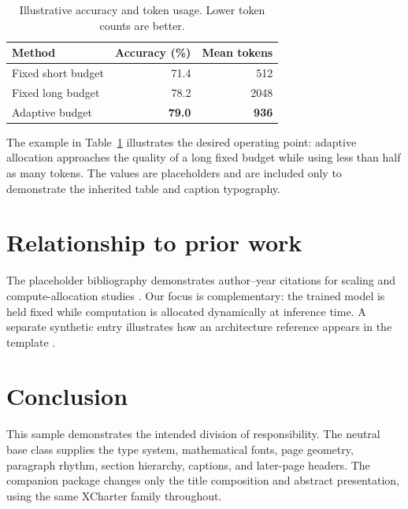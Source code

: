 \documentclass[11pt,onecolumn]{cleantechnicalreport}
\begin{document}
\begin{table}[t]
  \centering
  \caption{Illustrative accuracy and token usage. Lower token counts are better.}
  \label{tab:results}
  \begin{tabular}{lrr}
    \toprule
    Method & Accuracy (\%) & Mean tokens \\
    \midrule
    Fixed short budget & 71.4 & 512 \\
    Fixed long budget  & 78.2 & 2048 \\
    Adaptive budget    & \textbf{79.0} & \textbf{936} \\
    \bottomrule
  \end{tabular}
\end{table}

The example in Table~\ref{tab:results} illustrates the desired operating point:
adaptive allocation approaches the quality of a long fixed budget while using
less than half as many tokens. The values are placeholders and are included only
to demonstrate the inherited table and caption typography.

\section{Relationship to prior work}

The placeholder bibliography demonstrates author--year citations for scaling
and compute-allocation studies \citep{test2024scaling,test2025training}. Our
focus is complementary: the trained model is held fixed while computation is
allocated dynamically at inference time. A separate synthetic entry illustrates
how an architecture reference appears in the template \citep{test2023attention}.

\section{Conclusion}

This sample demonstrates the intended division of responsibility. The neutral
base class supplies the type system, mathematical fonts, page geometry,
paragraph rhythm, section hierarchy, captions, and later-page headers. The
companion package changes only the title composition and abstract presentation,
using the same XCharter family throughout.



\end{document}
